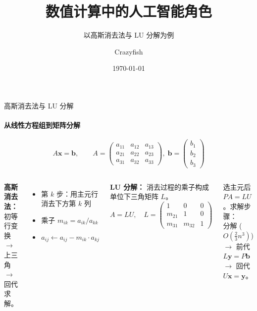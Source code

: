 \documentclass[12pt,aspectratio=169]{beamer}
\title{数值计算中的人工智能角色}
\subtitle{以高斯消去法与 LU 分解为例}
\author{Crazyfish}
\date{\today}
\begin{document}
\begin{frame}
\titlepage
\end{frame}

\begin{frame}[shrink]{高斯消去法与 LU 分解}
\framesubtitle{从线性方程组到矩阵分解}

\small
\[
A\mathbf{x}=\mathbf{b},\qquad
A = \begin{pmatrix}
a_{11} & a_{12} & a_{13}\\
a_{21} & a_{22} & a_{23}\\
a_{31} & a_{32} & a_{33}
\end{pmatrix},\;
\mathbf{b} = \begin{pmatrix}b_1\\b_2\\b_3\end{pmatrix}
\]

\vspace{4pt}
\begin{columns}[T]
\textbf{高斯消去法：} 初等行变换 $\to$ 上三角 $\to$ 回代求解。

\begin{itemize}
  \item 第 $k$ 步：用主元行消去下方第 $k$ 列
  \item 乘子 $m_{ik} = a_{ik}/a_{kk}$
  \item $a_{ij} \leftarrow a_{ij} - m_{ik}\cdot a_{kj}$
\end{itemize}

\textbf{LU 分解：} 消去过程的乘子构成单位下三角矩阵 $L$。
\[
A = LU,\quad
L = \begin{pmatrix}1&0&0\\m_{21}&1&0\\m_{31}&m_{32}&1\end{pmatrix}
\]

\vspace{4pt}
选主元后 $PA = LU$。求解步骤：\\
分解 ($O(\frac{2}{3}n^3)$) $\to$ 前代 $L\mathbf{y}=P\mathbf{b}$ $\to$ 回代 $U\mathbf{x}=\mathbf{y}$。
\end{columns}
\end{frame}
\end{document}
